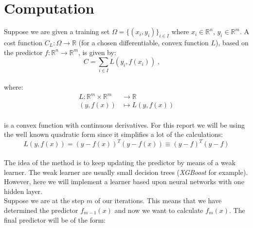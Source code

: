 \section*{Computation}

Suppose we are given a training set $\Omega = \{(x_i, y_i)\}_{i\in I}$ where $x_i\in\mathbb{R}^n$, $y_i\in\mathbb{R}^m$. A cost function $C_L: \Omega\rightarrow\mathbb{R}$ (for a chosen differentiable, convex function $L$), based on the predictor $f:\mathbb{R}^n\rightarrow\mathbb{R}^m$, is given by:\\

\begin{equation}
C = \sum_{i\in I} L(y_i, f(x_i))\;,\quad\;
\end{equation}\\

\noindent where:\\

\begin{equation*}
\begin{aligned}
L:\mathbb{R}^m\times\mathbb{R}^m&\rightarrow\mathbb{R}\\
(y, f(x))&\mapsto L(y, f(x))
\end{aligned}
\end{equation*}\\

\noindent is a convex function with continuous derivatives. For this report we will be using the well known quadratic form since it simplifies a lot of the calculations:\\

\begin{equation*}
L(y, f(x))=(y-f(x))^T(y-f(x))\equiv(y-f)^T(y-f)
\end{equation*}\\

The idea of the method is to keep updating the predictor by means of a weak learner. The weak learner are usually small decision trees (\emph{XGBoost} for example). However, here we will implement a learner based upon neural networks with one hidden layer.\\

Suppose we are at the step $m$ of our iterations. This means that we have determined the predictor $f_{m-1}(x)$ and now we want to calculate $f_{m}(x)$. The final predictor will be of the form:\\

